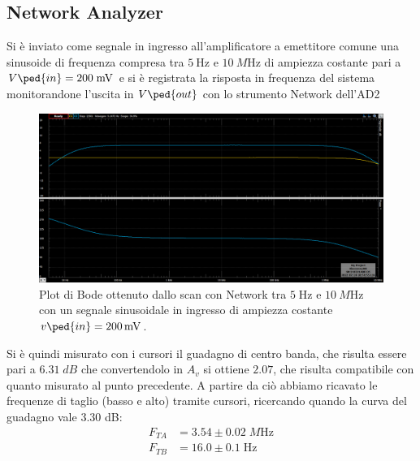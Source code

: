 \documentclass[10pt, a4paper, italian]{article}
\begin{document}
\subsection{Network Analyzer}
Si è inviato come segnale in ingresso all'amplificatore a emettitore comune una
sinusoide di frequenza compresa tra $\SI{5}{\Hz}$ e $\SI{10}{M\Hz}$ di
ampiezza costante pari a $V\ped{in} = 200 \; \si{m\V}$ e si è registrata la
risposta in frequenza del sistema monitorandone l'uscita in $V\ped{out}$ con
lo strumento Network dell'AD2
\begin{figure}[htbp]
    \centering
	\includegraphics[scale=0.4]{network}
    \caption{Plot di Bode ottenuto dallo scan con Network tra $5 \; \si{\Hz}$ e
$\SI{10}{M\Hz}$ con un segnale sinusoidale in ingresso di ampiezza costante
$v\ped{in} = \SI{200}{m\V}$. \label{fig: bodeplot}}
\end{figure}

Si è quindi misurato con i cursori il guadagno di centro banda, che risulta essere pari a $6.31 \; \si{dB}$ che convertendolo in $A_v$ si ottiene $2.07$, che risulta compatibile con quanto misurato al punto precedente.
A partire da ciò abbiamo ricavato le frequenze di taglio (basso e alto) tramite cursori, ricercando quando la curva del guadagno vale 3.30 dB:
\begin{align*}
F_{TA} &= 3.54 \pm 0.02 \; \si{M\Hz} \\
F_{TB} &= 16.0 \pm 0.1 \; \si{\Hz}
\end{align*}

\end{document}
